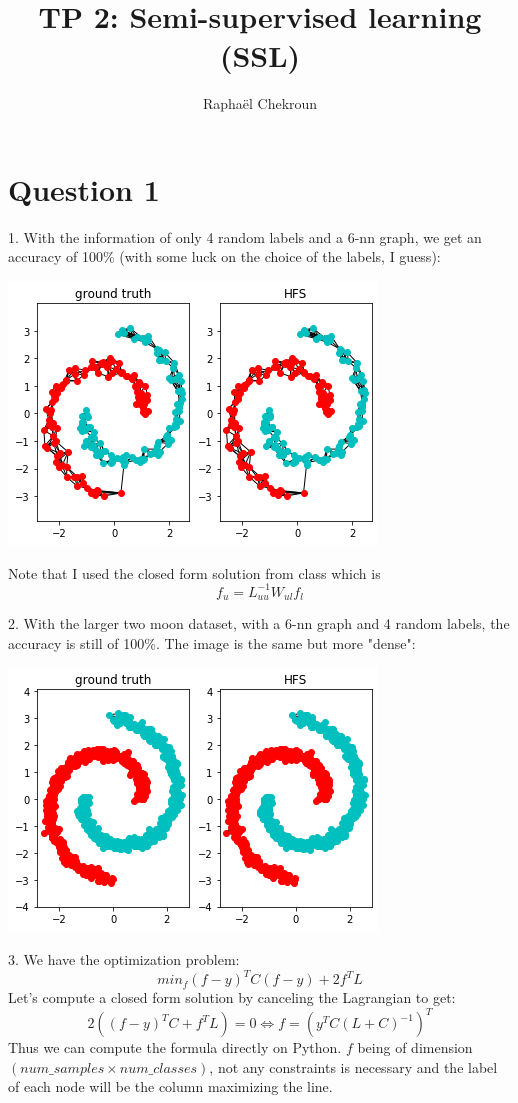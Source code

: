 \documentclass{article}
\title{TP 2: Semi-supervised learning (SSL)}
\author{Raphaël Chekroun}
\date{}
\begin{document}
\maketitle
\section{Question 1}


1. With the information of only 4 random labels and a 6-nn graph, we get an accuracy of 100\% (with some luck on the choice of the labels, I guess):
\begin{center}
	\includegraphics[scale=0.7]{1}
\end{center}

Note that I used the closed form solution from class which is 
$$
f_u = L_{uu}^{-1} W_{ul}f_l
$$

2. With the larger two moon dataset, with a 6-nn graph and 4 random labels, the accuracy is still of 100\%.
The image is the same but more "dense":
\begin{center}
	\includegraphics[scale=0.7]{2}
\end{center}

3. We have the optimization problem:
$$
min_f (f-y)^T C (f-y) + 2f^T L
$$
Let's compute a closed form solution by canceling the Lagrangian to get:
$$
2\left((f-y)^T C + f^T L\right) = 0 \iff \boxed{f = \left(y^T C (L+C)^{-1}\right)^T}
$$
Thus we can compute the formula directly on Python. $f$ being of dimension $(num\_samples \times num\_classes)$, not any constraints is necessary and the label of each node will be the column maximizing the line.
\end{document}
